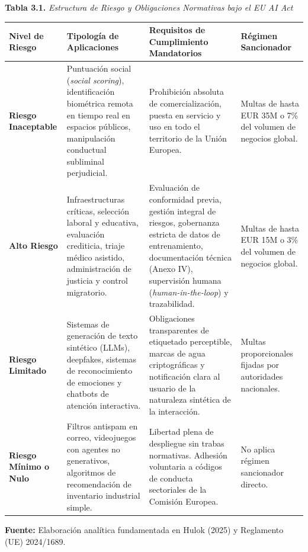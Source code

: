 \begin{table}[htbp]
\centering
\small
\textbf{Tabla 3.1.} \textit{Estructura de Riesgo y Obligaciones Normativas bajo el EU AI Act}\\[0.25cm]
\label{tab:niveles_riesgo_ai_act}
\begin{tabularx}{\textwidth}{p{2.8cm} p{4.2cm} p{4.8cm} p{2.2cm}}
\toprule
\textbf{Nivel de Riesgo} & \textbf{Tipología de Aplicaciones} & \textbf{Requisitos de Cumplimiento Mandatorios} & \textbf{Régimen Sancionador} \\
\midrule
\textbf{Riesgo Inaceptable} & Puntuación social (\textit{social scoring}), identificación biométrica remota en tiempo real en espacios públicos, manipulación conductual subliminal perjudicial. & Prohibición absoluta de comercialización, puesta en servicio y uso en todo el territorio de la Unión Europea. & Multas de hasta EUR 35M o 7\% del volumen de negocios global. \\
\addlinespace
\textbf{Alto Riesgo} & Infraestructuras críticas, selección laboral y educativa, evaluación crediticia, triaje médico asistido, administración de justicia y control migratorio. & Evaluación de conformidad previa, gestión integral de riesgos, gobernanza estricta de datos de entrenamiento, documentación técnica (Anexo IV), supervisión humana (\textit{human-in-the-loop}) y trazabilidad. & Multas de hasta EUR 15M o 3\% del volumen de negocios global. \\
\addlinespace
\textbf{Riesgo Limitado} & Sistemas de generación de texto sintético (LLMs), deepfakes, sistemas de reconocimiento de emociones y chatbots de atención interactiva. & Obligaciones transparentes de etiquetado perceptible, marcas de agua criptográficas y notificación clara al usuario de la naturaleza sintética de la interacción. & Multas proporcionales fijadas por autoridades nacionales. \\
\addlinespace
\textbf{Riesgo Mínimo o Nulo} & Filtros antispam en correo, videojuegos con agentes no generativos, algoritmos de recomendación de inventario industrial simple. & Libertad plena de despliegue sin trabas normativas. Adhesión voluntaria a códigos de conducta sectoriales de la Comisión Europea. & No aplica régimen sancionador directo. \\
\bottomrule
\end{tabularx}
\begin{center}
\scriptsize \textbf{Fuente:} Elaboración analítica fundamentada en Hulok (2025) y Reglamento (UE) 2024/1689.
\end{center}
\end{table}

